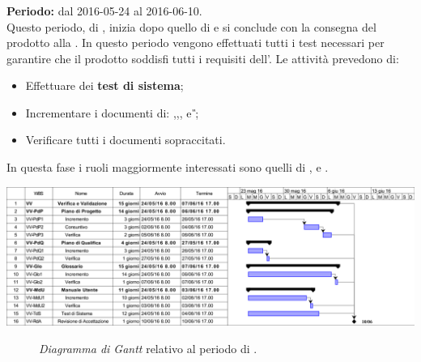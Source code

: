 \subsubsection{\VV}
\textbf{Periodo:} dal 2016-05-24 al 2016-06-10. \\
Questo periodo, di \VV, inizia dopo quello di \CO  e si conclude con la consegna del prodotto alla \RA. In questo periodo vengono effettuati tutti i test necessari per garantire che il prodotto soddisfi tutti i requisiti dell'\AR.  
Le attività prevedono di:
\begin{itemize}
	\item Effettuare dei \textbf{test di sistema};  
	\item Incrementare i documenti di: \textit{\MU},\textit{\NdP},\textit{\PdP}, \textit{\PdQ} e \textit{\G};
	\item Verificare tutti i documenti sopraccitati.
\end{itemize}
In questa fase i ruoli maggiormente interessati sono quelli di \textit{\Res}, \textit{\Prog} e \textit{\Ver}. 
\newpage
\begin{center}
	\includegraphics[keepaspectratio = true, width=16cm]{immagini/PdP_VerificaEValidazioneGantt.png}
\end{center}
\begin{figure}[h]
	\caption{\textit{Diagramma di Gantt} relativo al periodo di \VV.}\label{etichetta}
\end{figure}